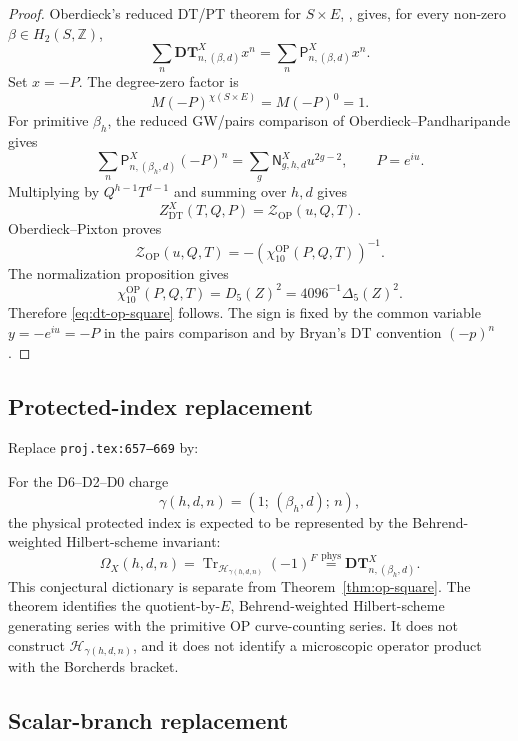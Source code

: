 \begin{proof}
Oberdieck's reduced DT/PT theorem for \(S\times E\),
\cite[Theorem 3(i)]{OberdieckReducedPT}, gives, for every non-zero
\(\beta\in H_2(S,\mathbb Z)\),
\[
\sum_n\mathbf{DT}^X_{n,(\beta,d)}x^n
=
\sum_n\mathsf P^X_{n,(\beta,d)}x^n.
\]
Set \(x=-P\).  The degree-zero factor is
\[
M(-P)^{\chi(S\times E)}=M(-P)^0=1.
\]
For primitive \(\beta_h\), the reduced GW/pairs comparison of
Oberdieck--Pandharipande \cite{OPand} gives
\[
\sum_n\mathsf P^X_{n,(\beta_h,d)}(-P)^n
=
\sum_g\mathsf N^X_{g,h,d}u^{2g-2},
\qquad P=e^{iu}.
\]
Multiplying by \(Q^{h-1}T^{d-1}\) and summing over \(h,d\) gives
\[
Z^X_{\mathrm{DT}}(T,Q,P)
=\mathcal Z_{\mathrm{OP}}(u,Q,T).
\]
Oberdieck--Pixton \cite[Theorem 1]{OB} proves
\[
\mathcal Z_{\mathrm{OP}}(u,Q,T)
=-\left(\chi_{10}^{\mathrm{OP}}(P,Q,T)\right)^{-1}.
\]
The normalization proposition gives
\[
\chi_{10}^{\mathrm{OP}}(P,Q,T)
=D_5(Z)^2
=4096^{-1}\Delta_5(Z)^2.
\]
Therefore \eqref{eq:dt-op-square} follows.  The sign is fixed by the
common variable \(y=-e^{iu}=-P\) in the pairs comparison and by Bryan's
DT convention \((-p)^n\).
\end{proof}

\subsection{Protected-index replacement}

Replace \texttt{proj.tex:657--669} by:

\begin{conjecture}
For the D6--D2--D0 charge
\[
\gamma(h,d,n)=(1;\,(\beta_h,d);\,n),
\]
the physical protected index is expected to be represented by the
Behrend-weighted Hilbert-scheme invariant:
\[
\Omega_X(h,d,n)
=\operatorname{Tr}_{\mathcal H_{\gamma(h,d,n)}}(-1)^F
\stackrel{\mathrm{phys}}{=}
\mathbf{DT}^X_{n,(\beta_h,d)}.
\]
This conjectural dictionary is separate from
Theorem~\ref{thm:op-square}.  The theorem identifies the
quotient-by-\(E\), Behrend-weighted Hilbert-scheme generating series with
the primitive OP curve-counting series.  It does not construct
\(\mathcal H_{\gamma(h,d,n)}\), and it does not identify a microscopic
operator product with the Borcherds bracket.
\end{conjecture}

\subsection{Scalar-branch replacement}


